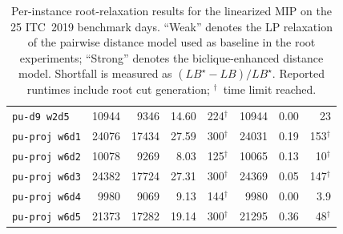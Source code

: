 \documentclass[11pt]{article}
\begin{document}
\begin{table}[ht]
\begin{tabular}{@{}lr rrr rrr@{}}
\texttt{pu-d9 w2d5} & 10944 & 9346 & 14.60 & 224$^\dagger$ & 10944 & 0.00 & 23 \\
\texttt{pu-proj w6d1} & 24076 & 17434 & 27.59 & 300$^\dagger$ & 24031 & 0.19 & 153$^\dagger$ \\
\texttt{pu-proj w6d2} & 10078 & 9269 & 8.03 & 125$^\dagger$ & 10065 & 0.13 & 10$^\dagger$ \\
\texttt{pu-proj w6d3} & 24382 & 17724 & 27.31 & 300$^\dagger$ & 24369 & 0.05 & 147$^\dagger$ \\
\texttt{pu-proj w6d4} & 9980 & 9069 & 9.13 & 144$^\dagger$ & 9980 & 0.00 & 3.9 \\
\texttt{pu-proj w6d5} & 21373 & 17282 & 19.14 & 300$^\dagger$ & 21295 & 0.36 & 48$^\dagger$ \\
\hline
\end{tabular}
\caption{Per-instance root-relaxation results for the linearized MIP on the 25
ITC~2019 benchmark days. ``Weak'' denotes the LP relaxation of the pairwise
distance model used as baseline in the root experiments; ``Strong'' denotes
the biclique-enhanced distance model. Shortfall is measured as
$(LB^\star - LB)/LB^\star$. Reported runtimes include root cut generation;
$^\dagger$~time limit reached.}
\label{tab:app-root-itc}
\end{table}
\end{document}
